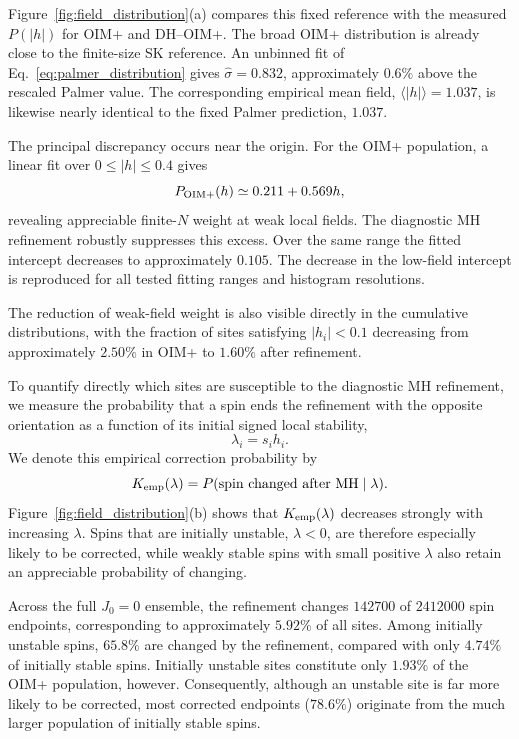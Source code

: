 \documentclass[
reprint,
amsmath,amssymb,
aps,
pre,
floatfix,
]{revtex4-2}
\begin{document}
Figure~\ref{fig:field_distribution}(a) compares this fixed reference with
the measured $P(|h|)$ for OIM+ and DH--OIM+. The broad OIM+ distribution is
already close to the finite-size SK reference. An unbinned fit of
Eq.~\eqref{eq:palmer_distribution} gives
$\hat{\sigma}=0.832$, approximately $0.6\%$ above the rescaled Palmer value.
The corresponding empirical mean field,
$\langle |h|\rangle=1.037$, is likewise nearly identical to the fixed
Palmer prediction, $1.037$.

The principal discrepancy occurs near the origin. For the OIM+ population,
a linear fit over $0\leq |h|\leq0.4$ gives
\begin{equation}
    P_{\rm OIM+}(h)
    \simeq
    0.211 + 0.569 h ,
    \label{eq:oim_small_field}
\end{equation}
revealing appreciable finite-$N$ weight at weak local fields. The
diagnostic MH refinement robustly suppresses this excess. Over the same
range the fitted intercept decreases to approximately $0.105$.
The decrease in the low-field intercept is reproduced for all tested fitting ranges and histogram resolutions.



The reduction of weak-field weight is also visible directly in the
cumulative distributions, with the fraction of sites satisfying
$|h_i|<0.1$ decreasing from approximately $2.50\%$ in OIM+ to
$1.60\%$ after refinement.

To quantify directly which sites are susceptible to the diagnostic MH
refinement, we measure the probability that a spin ends the refinement with
the opposite orientation as a function of its initial signed local
stability,
\begin{equation}
    \lambda_i=s_i h_i .
\end{equation}
We denote this empirical correction probability by
\begin{equation}
    K_{\rm emp}(\lambda)
    =
    P(\text{spin changed after MH}\mid\lambda).
    \label{eq:correction_kernel}
\end{equation}
Figure~\ref{fig:field_distribution}(b) shows that
$K_{\rm emp}(\lambda)$ decreases strongly with increasing $\lambda$.
Spins that are initially unstable, $\lambda<0$, are therefore especially
likely to be corrected, while weakly stable spins with small positive
$\lambda$ also retain an appreciable probability of changing.

Across the full $J_0=0$ ensemble, the refinement changes
$142700$ of $2412000$ spin endpoints, corresponding to approximately
$5.92\%$ of all sites. Among initially unstable spins,
$65.8\%$ are changed by the refinement, compared with only $4.74\%$ of
initially stable spins. Initially unstable sites constitute only $1.93\%$
of the OIM+ population, however. Consequently, although an unstable site
is far more likely to be corrected, most corrected endpoints
($78.6\%$) originate from the much larger population of initially stable
spins.
\end{document}
